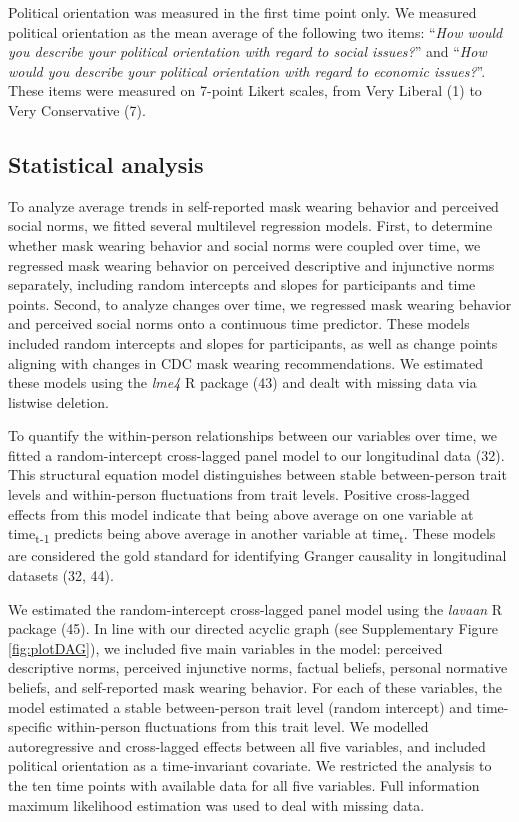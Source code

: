 \documentclass[
  man,floatsintext]{apa6}
\begin{document}
Political orientation was measured in the first time point only. We measured political orientation as the mean average of the following two items: ``\emph{How would you describe your political orientation with regard to social issues?}'' and ``\emph{How would you describe your political orientation with regard to economic issues?}''. These items were measured on 7-point Likert scales, from Very Liberal (1) to Very Conservative (7).

\hypertarget{statistical-analysis}{%
\subsection{Statistical analysis}\label{statistical-analysis}}

To analyze average trends in self-reported mask wearing behavior and perceived social norms, we fitted several multilevel regression models. First, to determine whether mask wearing behavior and social norms were coupled over time, we regressed mask wearing behavior on perceived descriptive and injunctive norms separately, including random intercepts and slopes for participants and time points. Second, to analyze changes over time, we regressed mask wearing behavior and perceived social norms onto a continuous time predictor. These models included random intercepts and slopes for participants, as well as change points aligning with changes in CDC mask wearing recommendations. We estimated these models using the \emph{lme4} R package (43) and dealt with missing data via listwise deletion.

To quantify the within-person relationships between our variables over time, we fitted a random-intercept cross-lagged panel model to our longitudinal data (32). This structural equation model distinguishes between stable between-person trait levels and within-person fluctuations from trait levels. Positive cross-lagged effects from this model indicate that being above average on one variable at time\textsubscript{t-1} predicts being above average in another variable at time\textsubscript{t}. These models are considered the gold standard for identifying Granger causality in longitudinal datasets (32, 44).

We estimated the random-intercept cross-lagged panel model using the \emph{lavaan} R package (45). In line with our directed acyclic graph (see Supplementary Figure \ref{fig:plotDAG}), we included five main variables in the model: perceived descriptive norms, perceived injunctive norms, factual beliefs, personal normative beliefs, and self-reported mask wearing behavior. For each of these variables, the model estimated a stable between-person trait level (random intercept) and time-specific within-person fluctuations from this trait level. We modelled autoregressive and cross-lagged effects between all five variables, and included political orientation as a time-invariant covariate. We restricted the analysis to the ten time points with available data for all five variables. Full information maximum likelihood estimation was used to deal with missing data.
\end{document}
